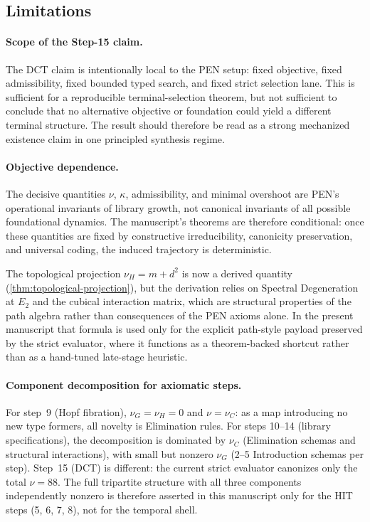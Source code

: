 \documentclass[11pt,a4paper]{article}
\theoremstyle{plain}
\theoremstyle{definition}
\theoremstyle{remark}
\begin{document}
\subsection{Limitations}

\paragraph{Scope of the Step-15 claim.}
The DCT claim is intentionally local to the PEN setup: fixed objective, fixed admissibility, fixed bounded typed search, and fixed strict selection lane.
This is sufficient for a reproducible terminal-selection theorem, but not sufficient to conclude that no alternative objective or foundation could yield a different terminal structure.
The result should therefore be read as a strong mechanized existence claim in one principled synthesis regime.

\paragraph{Objective dependence.}
The decisive quantities $\nu$, $\kappa$, admissibility, and minimal overshoot are PEN's operational invariants of library growth, not canonical invariants of all possible foundational dynamics.
The manuscript's theorems are therefore conditional: once these quantities are fixed by constructive irreducibility, canonicity preservation, and universal coding, the induced trajectory is deterministic.

The topological projection $\nu_H = m + d^2$ is now a derived quantity (\cref{thm:topological-projection}), but the derivation relies on Spectral Degeneration at $E_2$ and the cubical interaction matrix, which are structural properties of the path algebra rather than consequences of the PEN axioms alone.
In the present manuscript that formula is used only for the explicit path-style payload preserved by the strict evaluator, where it functions as a theorem-backed shortcut rather than as a hand-tuned late-stage heuristic.

\paragraph{Component decomposition for axiomatic steps.}
For step~9 (Hopf fibration), $\nu_G = \nu_H = 0$ and $\nu = \nu_C$: as a map introducing no new type formers, all novelty is Elimination rules.
For steps 10--14 (library specifications), the decomposition is dominated by $\nu_C$ (Elimination schemas and structural interactions), with small but nonzero $\nu_G$ (2--5 Introduction schemas per step).
Step~15 (DCT) is different: the current strict evaluator canonizes only the total $\nu = 88$.
The full tripartite structure with all three components independently nonzero is therefore asserted in this manuscript only for the HIT steps (5, 6, 7, 8), not for the temporal shell.
\end{document}
